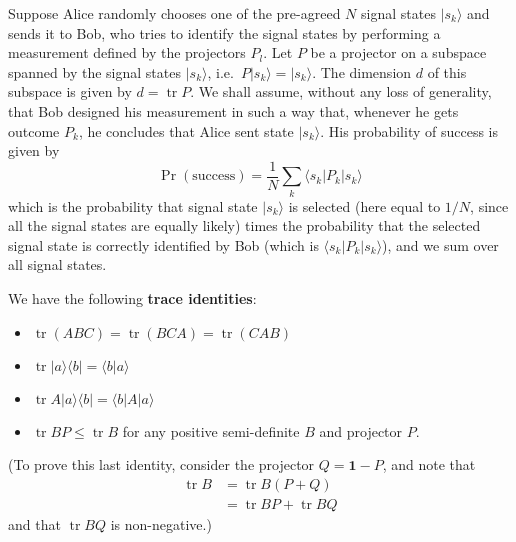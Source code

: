 \documentclass[fleqn]{article}
\providecommand{\tightlist}{%
  \setlength{\itemsep}{0pt}\setlength{\parskip}{0pt}}
\newenvironment{idea}{\noindent}{\medskip}
\begin{document}
Suppose Alice randomly chooses one of the pre-agreed \(N\) signal states \(|s_k\rangle\) and sends it to Bob, who tries to identify the signal states by performing a measurement defined by the projectors \(P_l\).
Let \(P\) be a projector on a subspace spanned by the signal states \(|s_k\rangle\), i.e.~\(P|s_k\rangle = |s_k\rangle\).
The dimension \(d\) of this subspace is given by \(d = \operatorname{tr}P\).
We shall assume, without any loss of generality, that Bob designed his measurement in such a way that, whenever he gets outcome \(P_k\), he concludes that Alice sent state \(|s_k\rangle\).
His probability of success is given by
\[
  \Pr(\text{success})
  = \frac{1}{N} \sum_k \langle s_k|P_k|s_k\rangle
\]
which is the probability that signal state \(|s_k\rangle\) is selected (here equal to \(1/N\), since all the signal states are equally likely) times the probability that the selected signal state is correctly identified by Bob (which is \(\langle s_k|P_k|s_k\rangle\)), and we sum over all signal states.

\begin{idea}
We have the following \textbf{trace identities}:

\begin{itemize}
\tightlist
\item
  \(\operatorname{tr}(ABC) = \operatorname{tr}(BCA) = \operatorname{tr}(CAB)\)
\item
  \(\operatorname{tr}|a\rangle\langle b| = \langle b|a\rangle\)
\item
  \(\operatorname{tr}A|a\rangle\langle b| = \langle b|A|a\rangle\)
\item
  \(\operatorname{tr}BP \leqslant\operatorname{tr}B\) for any positive semi-definite \(B\) and projector \(P\).
\end{itemize}

(To prove this last identity, consider the projector \(Q=\mathbf{1}-P\), and note that
\[
  \begin{aligned}
    \operatorname{tr}B
    &= \operatorname{tr}B(P+Q)
  \\&= \operatorname{tr}BP + \operatorname{tr}BQ
  \end{aligned}
\]
and that \(\operatorname{tr}BQ\) is non-negative.)

\end{idea}
\end{document}
